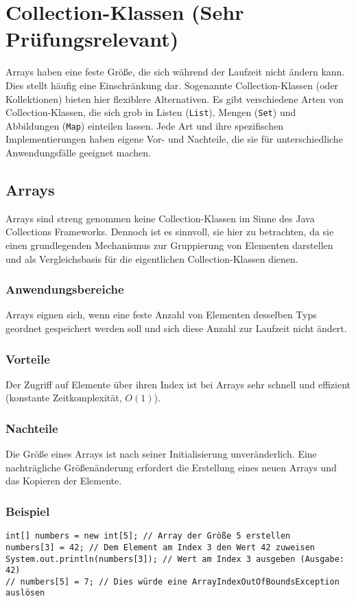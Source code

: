 \chapter{Collection-Klassen (Sehr Prüfungsrelevant)}
\label{chap:CollectionKlassen}

Arrays haben eine feste Größe, die sich während der Laufzeit nicht ändern kann. Dies stellt häufig eine Einschränkung dar. Sogenannte Collection-Klassen (oder Kollektionen) bieten hier flexiblere Alternativen. Es gibt verschiedene Arten von Collection-Klassen, die sich grob in Listen (\texttt{List}), Mengen (\texttt{Set}) und Abbildungen (\texttt{Map}) einteilen lassen. Jede Art und ihre spezifischen Implementierungen haben eigene Vor- und Nachteile, die sie für unterschiedliche Anwendungsfälle geeignet machen.

\section{Arrays}
Arrays sind streng genommen keine Collection-Klassen im Sinne des Java Collections Frameworks. Dennoch ist es sinnvoll, sie hier zu betrachten, da sie einen grundlegenden Mechanismus zur Gruppierung von Elementen darstellen und als Vergleichsbasis für die eigentlichen Collection-Klassen dienen.

\subsection{Anwendungsbereiche}
Arrays eignen sich, wenn eine feste Anzahl von Elementen desselben Typs geordnet gespeichert werden soll und sich diese Anzahl zur Laufzeit nicht ändert.

\subsection{Vorteile}
Der Zugriff auf Elemente über ihren Index ist bei Arrays sehr schnell und effizient (konstante Zeitkomplexität, $O(1)$).

\subsection{Nachteile}
Die Größe eines Arrays ist nach seiner Initialisierung unveränderlich. Eine nachträgliche Größenänderung erfordert die Erstellung eines neuen Arrays und das Kopieren der Elemente.

\subsection{Beispiel}
\begin{lstlisting}[caption={Beispiel für die Verwendung eines Arrays in Java}, label=lst:arrayExample]
int[] numbers = new int[5]; // Array der Größe 5 erstellen
numbers[3] = 42; // Dem Element am Index 3 den Wert 42 zuweisen
System.out.println(numbers[3]); // Wert am Index 3 ausgeben (Ausgabe: 42)
// numbers[5] = 7; // Dies würde eine ArrayIndexOutOfBoundsException auslösen
\end{lstlisting}

